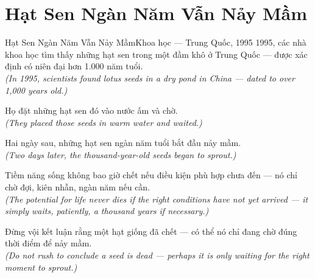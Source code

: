 \section{Hạt Sen Ngàn Năm Vẫn Nảy Mầm}
\begin{truyen}{Hạt Sen Ngàn Năm Vẫn Nảy Mầm}{Khoa học --- Trung Quốc, 1995}
 1995, các nhà khoa học tìm thấy những hạt sen trong một đầm khô ở Trung Quốc --- được xác định có niên đại hơn 1.000 năm tuổi.\\[4pt]
\textit{(In 1995, scientists found lotus seeds in a dry pond in China --- dated to over 1,000 years old.)}

Họ đặt những hạt sen đó vào nước ấm và chờ.\\[4pt]
\textit{(They placed those seeds in warm water and waited.)}

Hai ngày sau, những hạt sen ngàn năm tuổi bắt đầu nảy mầm.\\[4pt]
\textit{(Two days later, the thousand-year-old seeds began to sprout.)}

Tiềm năng sống không bao giờ chết nếu điều kiện phù hợp chưa đến --- nó chỉ chờ đợi, kiên nhẫn, ngàn năm nếu cần.\\[4pt]
\textit{(The potential for life never dies if the right conditions have not yet arrived --- it simply waits, patiently, a thousand years if necessary.)}

\end{truyen}
\begin{baihoc}
  Đừng vội kết luận rằng một hạt giống đã chết --- có thể nó chỉ đang chờ đúng thời điểm để nảy mầm.\\[4pt]
  \textit{(Do not rush to conclude a seed is dead --- perhaps it is only waiting for the right moment to sprout.)}
\end{baihoc}
